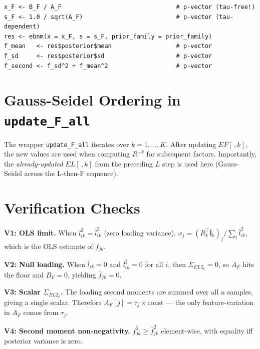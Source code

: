 \documentclass[11pt]{article}
\newcommand{\lbar}[2]{\bar{l}_{#1#2}}
\newcommand{\lsec}[2]{\overline{l^2_{#1#2}}}
\newcommand{\Rk}[0]{R^{-k}}
\begin{document}
\begin{codebox}
\begin{verbatim}
x_F <- B_F / A_F                                # p-vector (tau-free!)
s_F <- 1.0 / sqrt(A_F)                          # p-vector (tau-dependent)
res <- ebnm(x = x_F, s = s_F, prior_family = prior_family)
f_mean   <- res$posterior$mean                  # p-vector
f_sd     <- res$posterior$sd                    # p-vector
f_second <- f_sd^2 + f_mean^2                   # p-vector
\end{verbatim}
\end{codebox}

\section{Gauss-Seidel Ordering in \texttt{update\_F\_all}}\label{sec:gauss-seidel}

The wrapper \texttt{update\_F\_all} iterates over $k = 1,\ldots,K$.
After updating $EF[\,,k]$, the new values are used when computing $\Rk$
for subsequent factors.  Importantly, the \emph{already-updated}
$EL[\,,k]$ from the preceding $L$ step is used here (Gauss-Seidel
across the L-then-F sequence).

\section{Verification Checks}\label{sec:verification}

\begin{verifybox}
\textbf{V1: OLS limit.}  When $\lsec{i}{k} = \lbar{i}{k}^2$ (zero loading
variance), $x_j = (R_k^\top\bar{\bm{l}}_k)_j / \sum_i\lbar{i}{k}^2$, which
is the OLS estimate of $f_{jk}$.

\textbf{V2: Null loading.}  When $\bar{l}_{ik} = 0$ and $\lsec{i}{k} = 0$
for all $i$, then $\Sigma_{EL2_k} = 0$, so $A_F$ hits the floor and $B_F = 0$,
yielding $\bar{f}_{jk} = 0$.

\textbf{V3: Scalar $\Sigma_{EL2_k}$.}  The loading second moments are summed
over all $n$ samples, giving a single scalar.  Therefore $A_F[j] = \tau_j
\times \text{const}$ — the only feature-variation in $A_F$ comes from $\tau_j$.

\textbf{V4: Second moment non-negativity.}  $\overline{f^2_{jk}} \geq
\bar{f}_{jk}^2$ element-wise, with equality iff posterior variance is zero.
\end{verifybox}
\end{document}
